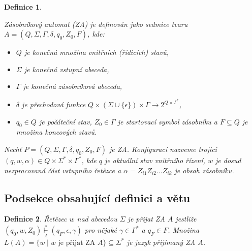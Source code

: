 \documentclass[a4paper, twocolumn, 11pt]{article}
\theoremstyle{plain}
\newtheorem{definition}{Definice}
\begin{document}
\begin{definition}\label{def:zasobnikovy-automat}

	\emph{Zásobníkový automat} (ZA) je definován jako sedmice tvaru
	$A = (Q, \Sigma, \Gamma, \delta, q_0, Z_0, F)$, kde:

	\begin{itemize}

		\item $Q$ je konečná množina \emph{vnitřních (řídicích) stavů},

		\item $\Sigma$ je konečná \emph{vstupní abeceda},

		\item $\Gamma$ je konečná \emph{zásobníková abeceda},

		\item $\delta$ je \emph{přechodová funkce}
		      $Q \times \left( \Sigma \cup \{ \epsilon \} \right) \times
			      \Gamma \rightarrow 2^{Q \times \Gamma^\ast} $,

		\item $q_0 \in Q$ je \emph{počáteční stav},
		      $Z_0 \in \Gamma$ je \emph{startovací symbol zásobníku}
		      a $F \subseteq Q$ je množina \emph{koncových stavů}.

	\end{itemize}

	\normalfont{}
	Nechť $P = (Q, \Sigma, \Gamma, \delta, q_0, Z_0, F)$ je ZA.
	\emph{Konfigurací} nazveme trojici
	$(q, w, \alpha) \in Q \times \Sigma^\ast \times \Gamma^\ast$, kde
	$q$ je aktuální stav vnitřního řízení,
	$w$ je dosud nezpracovaná část vstupního řetězce
	a $\alpha = Z_{i1} Z_{i2} \ldots Z_{ik}$ je obsah zásobníku.

\end{definition}

\subsection{Podsekce obsahující definici a větu}

\begin{definition}

	\emph{Řetězec $w$ nad abecedou $\Sigma$ je přijat ZA} $A$ jestliže
	${(q_0, w, Z_0) \underset{A}{\overset{*}{\vdash}} (q_F, \epsilon, \gamma)}$ pro nějaké
	${\gamma \in \Gamma^\ast}$ a ${q_F \in F}$.
	Množina $L(A) = \{ w \mid w \text{ je přijat ZA } A \} \subseteq \Sigma^\ast$
	je \emph{jazyk přijímaný ZA} $A$.

\end{definition}
\end{document}
